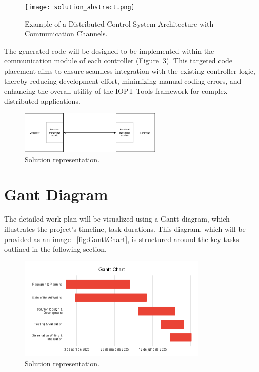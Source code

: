 \begin{figure}[htbp]
  \centering
  \texttt{[image: solution\_abstract.png]}
  \caption{Example of a Distributed Control System Architecture with Communication Channels.}
  \label{fig:distributed_system_example}
\end{figure}

 
The generated code will be designed to be implemented within the communication module of each controller (Figure~\ref{fig:representation}). This targeted code placement aims to ensure seamless integration with the existing controller logic, thereby reducing development effort, minimizing manual coding errors, and enhancing the overall utility of the IOPT-Tools framework for complex distributed applications.


 \begin{figure}[htbp]
  \centering
  \includegraphics[width=0.6\textwidth]{Chapters/Figures/Diagrama.png}
  \caption{Solution representation.}
  \label{fig:representation}
\end{figure}
 
 
 
\section{Gant Diagram }
\label{sec:gant_diagram}


The detailed work plan will be visualized using a Gantt diagram, which illustrates the project's timeline, task durations. This diagram, which will be provided as an image ~\ref{fig:GanttChart}, is structured around the key tasks outlined in the following section.

 \begin{figure}[htbp]
  \centering
  \includegraphics[width=0.8\textwidth]{Chapters/Figures/GanttChart.png}
  \caption{Solution representation.}
  \label{fig:representation}
\end{figure}
 

